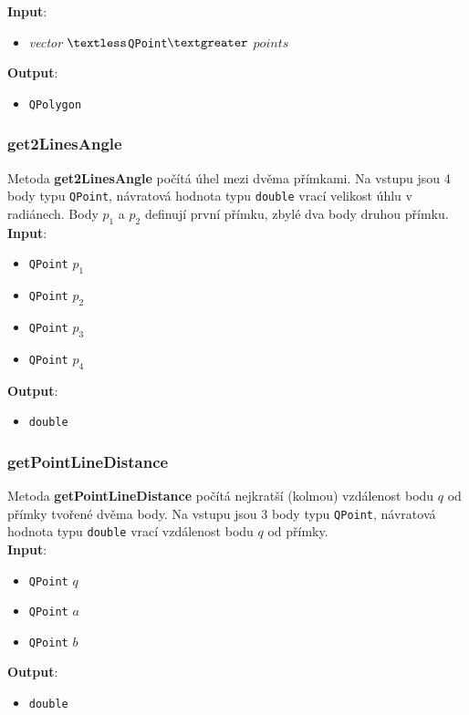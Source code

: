 \documentclass[a4paper, 12pt]{article}
\begin{document}
\textbf{Input}:
\begin{itemize}
\item \textsl{vector} $\textless$\texttt{QPoint}$\textgreater$ $points$
\end{itemize}

\textbf{Output}:
\begin{itemize}
\item \texttt{QPolygon}
\end{itemize}

\subsubsection{get2LinesAngle}
Metoda \textbf{get2LinesAngle} počítá úhel mezi dvěma přímkami. Na vstupu jsou 4 body typu \texttt{QPoint}, návratová hodnota typu \texttt{double} vrací velikost úhlu v radiánech. Body $p_1$ a $p_2$ definují první přímku, zbylé dva body druhou přímku.\\

\textbf{Input}:
\begin{itemize}
\item \texttt{QPoint} $p_1$ 
\item \texttt{QPoint} $p_2$ 
\item \texttt{QPoint} $p_3$
\item \texttt{QPoint} $p_4$
\end{itemize}

\textbf{Output}:
\begin{itemize}
\item \texttt{double} 
\end{itemize}

\subsubsection{getPointLineDistance}
Metoda \textbf{getPointLineDistance} počítá nejkratší (kolmou) vzdálenost bodu $q$ od přímky tvořené dvěma body. Na vstupu jsou 3 body typu \texttt{QPoint}, návratová hodnota typu \texttt{double} vrací vzdálenost bodu $q$ od přímky.\\ 

\textbf{Input}:
\begin{itemize}
\item \texttt{QPoint} $q$ 
\item \texttt{QPoint} $a$ 
\item \texttt{QPoint} $b$
\end{itemize}

\textbf{Output}:
\begin{itemize}
\item \texttt{double} 
\end{itemize}
\end{document}

